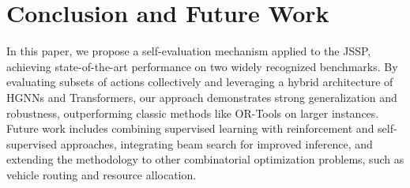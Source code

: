 \section{Conclusion and Future Work}

In this paper, we propose a self-evaluation mechanism applied to the JSSP, achieving state-of-the-art performance on two widely recognized benchmarks. By evaluating subsets of actions collectively and leveraging a hybrid architecture of HGNNs and Transformers, our approach demonstrates strong generalization and robustness, outperforming classic methods like OR-Tools on larger instances. Future work includes combining supervised learning with reinforcement and self-supervised approaches, integrating beam search for improved inference, and extending the methodology to other combinatorial optimization problems, such as vehicle routing and resource allocation.


